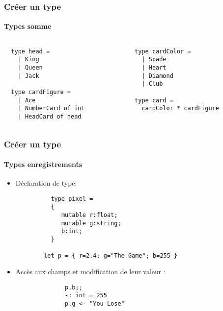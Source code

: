 \begin{frame}[fragile]
	\frametitle{Créer un type}
	\framesubtitle{Types somme}
	\begin{columns}
		\begin{column}{5cm}
			\begin{lstlisting}
  type head =
    | King
    | Queen
    | Jack

  type cardFigure =
    | Ace
    | NumberCard of int
    | HeadCard of head
			\end{lstlisting}
		\end{column}
		\begin{column}{7cm}
			\begin{lstlisting}
  type cardColor =
    | Spade
    | Heart
    | Diamond
    | Club

  type card =
    cardColor * cardFigure
			\end{lstlisting}
		\end{column}
	\end{columns}
\end{frame}


\begin{frame}[fragile]
	\frametitle{Créer un type}
	\framesubtitle{Types enregistrements}
	\begin{itemize}
	\item Déclaration de type:
		\begin{lstlisting}
		  type pixel =
		  {
		     mutable r:float;
		     mutable g:string;
		     b:int;
		  }

		let p = { r=2.4; g="The Game"; b=255 }
		\end{lstlisting}
	\item Accès aux champs et modification de leur valeur :
		\begin{lstlisting}
			  p.b;;
			  -: int = 255
			  p.g <- "You Lose"
		\end{lstlisting}
	\end{itemize}
\end{frame}




